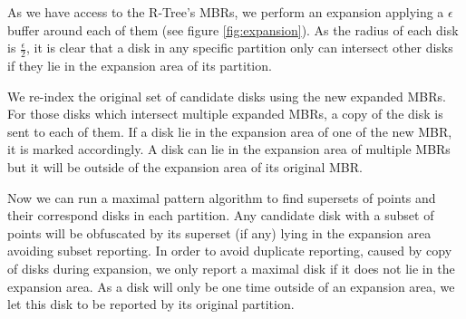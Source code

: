 \documentclass[12pt]{scrartcl}
\begin{document}
As we have access to the R-Tree's MBRs, we perform an expansion applying a $\epsilon$ buffer around each of them (see figure \ref{fig:expansion}). As the radius of each disk is $\frac{\epsilon}{2}$, it is clear that a disk in any specific partition only can intersect other disks if they lie in the expansion area of its partition.  

We re-index the original set of candidate disks using the new expanded MBRs.  For those disks which intersect multiple expanded MBRs, a copy of the disk is sent to each of them. If a disk lie in the expansion area of one of the new MBR, it is marked accordingly. A disk can lie in the expansion area of multiple MBRs but it will be outside of the expansion area of its original MBR. 

Now we can run a maximal pattern algorithm to find supersets of points and their correspond disks in each partition. Any candidate disk with a subset of points will be obfuscated by its superset (if any) lying in the expansion area avoiding subset reporting.  In order to avoid duplicate reporting, caused by copy of disks during expansion, we only report a maximal disk if it does not lie in the expansion area. As a disk will only be one time outside of an expansion area, we let this disk to be reported by its original partition.

\clearpage
\end{document}
